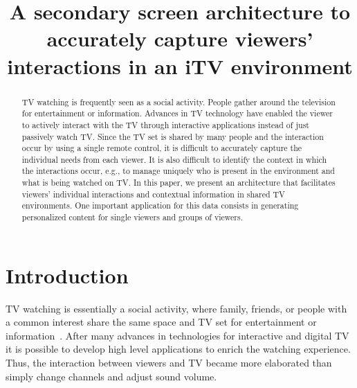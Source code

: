 \documentclass[conference,a4paper]{IEEEtran}
\begin{document}
\title{A secondary screen architecture to accurately capture viewers' interactions in an iTV environment}

\author{
\and
{}
}
\maketitle

\begin{abstract}
TV watching is frequently seen as a social activity. People gather around the television for entertainment or information. Advances in TV technology have enabled the viewer to actively interact with the TV through interactive applications instead of just passively watch TV. Since the TV set is shared by many people and the interaction occur by using a single remote control, it is difficult to accurately capture the individual needs from each viewer. It is also difficult to identify the context in which the interactions occur, e.g., to manage uniquely who is present in the environment and what is being watched on TV. In this paper, we present an architecture that facilitates viewers' individual interactions and contextual information in shared TV environments. One important application for this data consists in generating personalized content for single viewers and groups of viewers.
\end{abstract}

\IEEEpeerreviewmaketitle

\section{Introduction}

TV watching is essentially a social activity, where family, friends, or people with a common interest share the same space and TV set for entertainment or information~\cite{Masthoff2004}. After many advances in technologies for interactive and digital TV it is possible to develop high level applications to enrich the watching experience. Thus, the interaction between viewers and TV became more elaborated than simply change channels and adjust sound volume.
\end{document}
